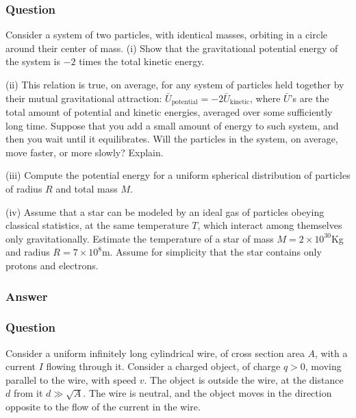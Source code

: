 \subsubsection{Question}
Consider a system of two particles, with identical masses, orbiting in a circle around their center of mass. (i) Show that the gravitational potential energy of the system is $-2$ times the total kinetic energy.

(ii) This relation is true, on average, for any system of particles held together by their mutual gravitational attraction: $\bar{U}_{\text{potential}}= -2\bar{U}_{\text{kinetic}}$, where $\bar{U}$'s are the total amount of potential and kinetic energies, averaged over some sufficiently long time. Suppose that you add a small amount of energy to such system, and then you wait until it equilibrates. Will the particles in the system, on average, move faster, or more slowly? Explain.

(iii) Compute the potential energy for a uniform spherical distribution of particles of radius $R$ and total mass $M$.

(iv) Assume that a star can be modeled by an ideal gas of particles obeying classical statistics, at the same temperature $T$, which interact among themselves only gravitationally. Estimate the temperature of a star of mass $M = 2 \times 10^{30}$Kg and radius $R = 7 \times 10^8$m. Assume for simplicity that the star contains only protons and electrons.

\subsubsection{Answer}


\subsubsection{Question}
Consider a uniform infinitely long cylindrical wire, of cross section area $A$, with a current $I$ flowing through it. Consider a charged object, of charge $q > 0$, moving parallel to the wire, with speed $v$. The object is outside the wire, at the distance $d$ from it $d \gg \sqrt{A}$. The wire is neutral, and the object moves in the direction opposite to the flow of the current in the wire.

